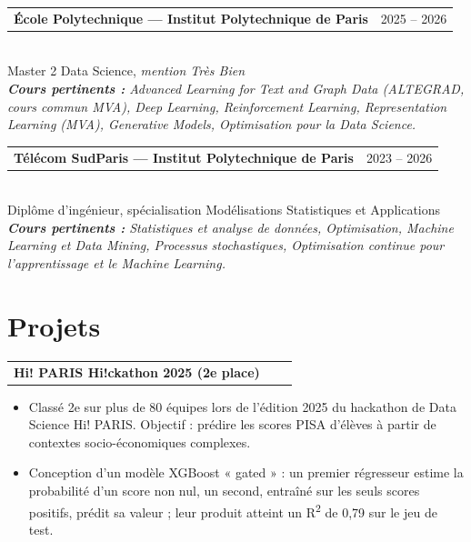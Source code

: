 \documentclass[a4paper,10pt]{article}
\makeatletter
\newenvironment{project}[2]
    {
    \begin{tabularx}{\linewidth}{@{}l X r@{}}
    \textbf{#1} & \hfill & #2
    \end{tabularx}
    \begin{minipage}[t]{\linewidth}
    \begin{itemize}[nosep,after=\strut, leftmargin=1em, itemsep=0pt,label=--]
    }
    {
    \end{itemize}
    \end{minipage}
    }
\makeatother
\begin{document}
\begin{tabularx}{\linewidth}{@{}X r@{}}
\textbf{École Polytechnique --- Institut Polytechnique de Paris} & 2025 -- 2026\\
\end{tabularx} \\
Master 2 Data Science, \textit{mention Très Bien}\\[1pt]
\textit{\textbf{Cours pertinents :} Advanced Learning for Text and Graph Data (ALTEGRAD, cours commun MVA), Deep Learning, Reinforcement Learning, Representation Learning (MVA), Generative Models, Optimisation pour la Data Science.} \\[6pt]
\begin{tabularx}{\linewidth}{@{}X r@{}}
\textbf{Télécom SudParis --- Institut Polytechnique de Paris} & 2023 -- 2026\\
\end{tabularx}\\
Diplôme d'ingénieur, spécialisation Modélisations Statistiques et Applications\\[1pt]
\textit{\textbf{Cours pertinents :} Statistiques et analyse de données, Optimisation, Machine Learning et Data Mining, Processus stochastiques, Optimisation continue pour l'apprentissage et le Machine Learning.}\\[-12pt]

\section{Projets}

\begin{project}{Hi! PARIS Hi!ckathon 2025 (2e place)}
{\href{https://github.com/maxencedbe/hi_paris_2025}{\textcolor{black}{\raisebox{-0.05\height}{\large \faGithub}}}}
    \item Classé 2e sur plus de 80 équipes lors de l'édition 2025 du hackathon de Data Science Hi! PARIS. Objectif : prédire les scores PISA d'élèves à partir de contextes socio-économiques complexes.
    \item Conception d'un modèle XGBoost « gated » : un premier régresseur estime la probabilité d'un score non nul, un second, entraîné sur les seuls scores positifs, prédit sa valeur ; leur produit atteint un R\textsuperscript{2} de 0,79 sur le jeu de test.
\end{project}\vspace{-6pt}
\end{document}
